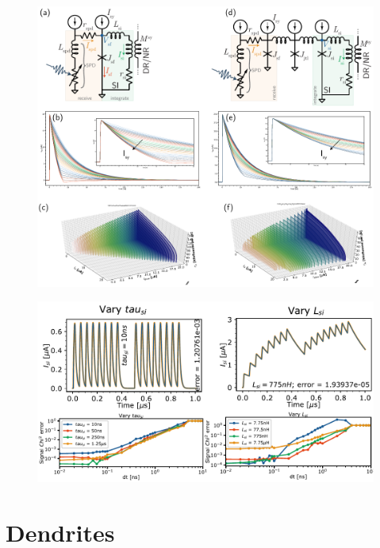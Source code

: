 \documentclass[twocolumn]{article}
\begin{document}
\begin{figure}[h!]
\includegraphics[width=17.2cm]{figures/_fig__synapses__circuits_responses.pdf}
\end{figure}

\begin{figure}[h!]
\includegraphics[width=17.2cm]{figures/_fig__synapses__comparison.pdf}
\end{figure}


\section{\label{sec:dendrites}Dendrites}
\end{document}
